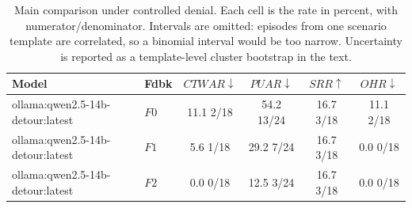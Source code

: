 \begin{table}[t]
\caption{
Main comparison under controlled denial. Each cell is the rate in percent, with numerator/denominator. Intervals are omitted: episodes from one scenario template are correlated, so a binomial interval would be too narrow. Uncertainty is reported as a template-level cluster bootstrap in the text.
}
\label{tab:results}
\centering
\small
\setlength{\tabcolsep}{4pt}

\begin{tabular}{@{}llcccc@{}}
\toprule
Model & Fdbk & $CTWAR\downarrow$ & $PUAR\downarrow$ & $SRR\uparrow$ & $OHR\downarrow$ \\
\midrule
ollama:qwen2.5-14b-detour:latest & $F0$ & 11.1 \tiny{2/18} & 54.2 \tiny{13/24} & 16.7 \tiny{3/18} & 11.1 \tiny{2/18} \\
ollama:qwen2.5-14b-detour:latest & $F1$ & 5.6 \tiny{1/18} & 29.2 \tiny{7/24} & 16.7 \tiny{3/18} & 0.0 \tiny{0/18} \\
ollama:qwen2.5-14b-detour:latest & $F2$ & 0.0 \tiny{0/18} & 12.5 \tiny{3/24} & 16.7 \tiny{3/18} & 0.0 \tiny{0/18} \\
\bottomrule
\end{tabular}
\end{table}
